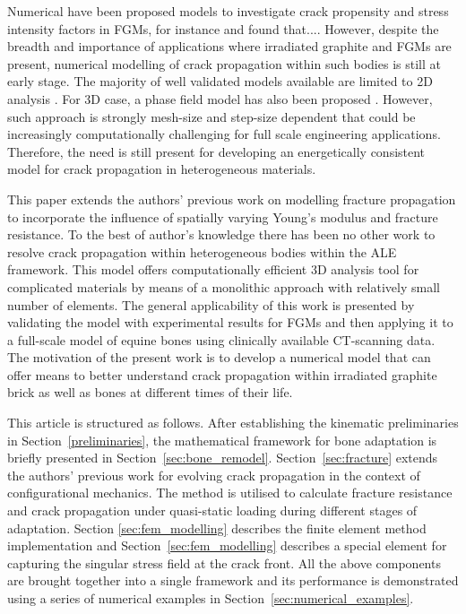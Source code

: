 \documentclass[onecolumn]{svjour3}
\begin{document}
Numerical have been proposed models to investigate crack propensity and stress intensity factors in FGMs,
for instance \cite{KimPaulino2002, Ayhan2009, ZhangBEM2011, ShiMan2014, ShojaeeDaneshmand2015} and found that....
However, despite the breadth and importance of applications where irradiated graphite and FGMs are present, 
numerical modelling of crack propagation within such bodies is still at early stage.
The majority of well validated models available are limited to 2D analysis \cite{KimPaulino2004,Bayesteh2013, Ooi2015, Chafi2019}.
For 3D case, a phase field model has also been proposed \cite{Hirshikesh2019}.
However, such approach is strongly mesh-size and step-size dependent that could be increasingly computationally challenging for full scale engineering applications.
Therefore, the need is still present for developing an energetically consistent model for crack propagation in heterogeneous materials.

This paper extends the authors' previous work on modelling fracture propagation \cite{kaczmarczyk2014three,kaczmarczyk2017energy} to incorporate the influence of spatially varying Young's modulus and fracture resistance.
To the best of author's knowledge there has been no other work to resolve crack propagation within heterogeneous bodies within the ALE framework.
This model offers computationally efficient 3D analysis tool for complicated materials by means of a monolithic approach with relatively small number of elements.
The general applicability of this work is presented by validating the model with experimental results for FGMs and then applying it to a full-scale model of equine bones using clinically available CT-scanning data.
The motivation of the present work is to develop a numerical model that can offer means to better understand crack propagation within irradiated graphite brick as well as bones at different times of their life.

This article is structured as follows. After establishing the kinematic preliminaries in Section~\ref{preliminaries}, the mathematical framework for bone adaptation is briefly presented in Section~\ref{sec:bone_remodel}. Section~\ref{sec:fracture} extends the authors' previous work for evolving crack propagation in the context of configurational mechanics. The method is utilised to calculate fracture resistance and crack propagation under quasi-static loading during different stages of adaptation. Section \ref{sec:fem_modelling} describes the finite element method implementation and Section~\ref{sec:fem_modelling} describes a special element for capturing the singular stress field at the crack front.  
All the above components are brought together into a single framework and its performance is demonstrated using a series of numerical examples in Section~\ref{sec:numerical_examples}.
\end{document}
